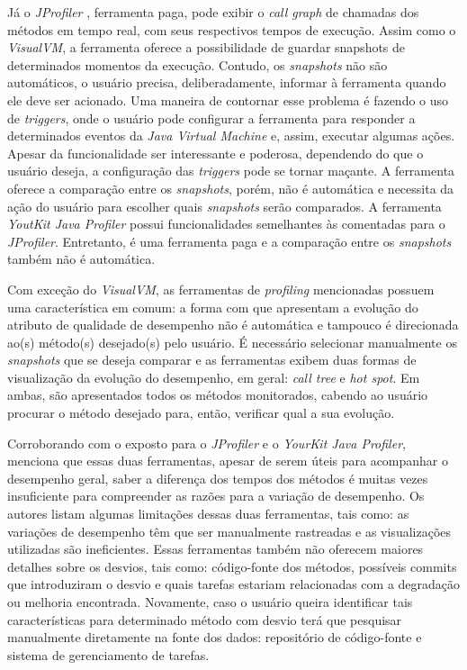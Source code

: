 Já o \textit{JProfiler} \cite{JProfiler}, ferramenta paga, pode exibir o \textit{call graph} de chamadas dos métodos em tempo real, com seus respectivos tempos de execução. Assim como o \textit{VisualVM}, a ferramenta oferece a possibilidade de guardar snapshots de determinados momentos da execução. Contudo, os \textit{snapshots} não são automáticos, o usuário precisa, deliberadamente, informar à ferramenta quando ele deve ser acionado. Uma maneira de contornar esse problema é fazendo o uso de \textit{triggers}, onde o usuário pode configurar a ferramenta para responder a determinados eventos da \textit{Java Virtual Machine}  e, assim, executar algumas ações. Apesar da funcionalidade ser interessante e poderosa, dependendo do que o usuário deseja, a configuração das \textit{triggers} pode se tornar maçante. A ferramenta oferece a comparação entre os \textit{snapshots}, porém, não é automática e necessita da ação do usuário para escolher quais \textit{snapshots} serão comparados. A ferramenta \textit{YoutKit Java Profiler} \cite{Profiler2016} possui funcionalidades semelhantes às comentadas para o \textit{JProfiler}. Entretanto, é uma ferramenta paga e a comparação entre os \textit{snapshots} também não é automática.

Com exceção do \textit{VisualVM}, as ferramentas de \textit{profiling} mencionadas possuem uma característica em comum: a forma com que apresentam a evolução do atributo de qualidade de desempenho não é automática e tampouco é direcionada ao(s) método(s) desejado(s) pelo usuário. É necessário selecionar manualmente os \textit{snapshots} que se deseja comparar e as ferramentas exibem duas formas de visualização da evolução do desempenho, em geral: \textit{call tree} e \textit{hot spot}. Em ambas, são apresentados todos os métodos monitorados, cabendo ao usuário procurar o método desejado para, então, verificar qual a sua evolução.

Corroborando com o exposto para o \textit{JProfiler} e o \textit{YourKit Java Profiler}, \citeauthor{SandovalAlcocer2013} menciona que essas duas ferramentas, apesar de serem úteis para acompanhar o desempenho geral, saber a diferença dos tempos dos métodos é muitas vezes insuficiente para compreender as razões para a variação de desempenho. Os autores listam algumas limitações dessas duas ferramentas, tais como: as variações de desempenho têm que ser manualmente rastreadas e as visualizações utilizadas são ineficientes. Essas ferramentas também não oferecem maiores detalhes sobre os desvios, tais como: código-fonte dos métodos, possíveis commits que introduziram o desvio e quais tarefas estariam relacionadas com a degradação ou melhoria encontrada. Novamente, caso o usuário queira identificar tais características para determinado método com desvio terá que pesquisar manualmente diretamente na fonte dos dados: repositório de código-fonte e sistema de gerenciamento de tarefas.

